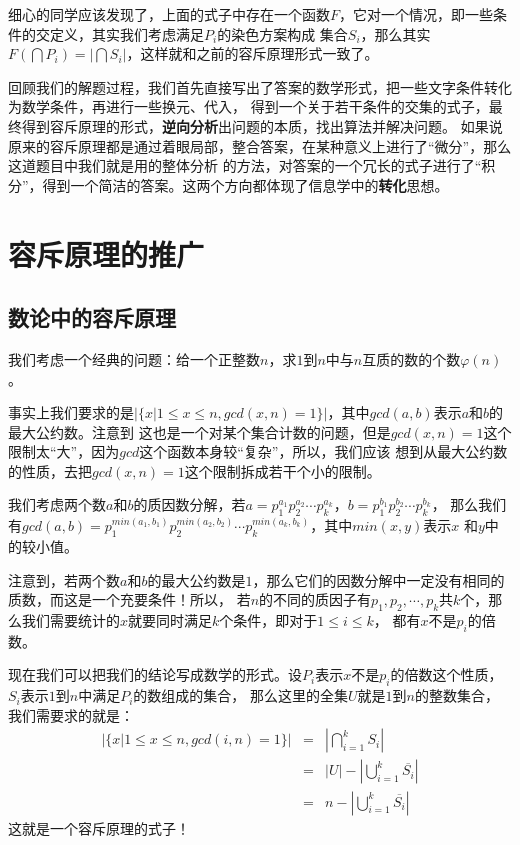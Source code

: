 \documentclass{noithesis}
\theoremstyle{plain}      \newtheorem{theorem}{定理}[subsection]
\theoremstyle{definition} \newtheorem{problem}{问题}[subsection]
\begin{document}
细心的同学应该发现了，上面的式子中存在一个函数$F$，它对一个情况，即一些条件的交定义，其实我们考虑满足$P_i$的染色方案构成
集合$S_i$，那么其实$F\left( \bigcap P_i \right) = | \bigcap S_i |$，这样就和之前的容斥原理形式一致了。 \par

回顾我们的解题过程，我们首先直接写出了答案的数学形式，把一些文字条件转化为数学条件，再进行一些换元、代入，
得到一个关于若干条件的交集的式子，最终得到容斥原理的形式，\textbf{逆向分析}出问题的本质，找出算法并解决问题。
如果说原来的容斥原理都是通过着眼局部，整合答案，在某种意义上进行了“微分”，那么这道题目中我们就是用的整体分析
的方法，对答案的一个冗长的式子进行了“积分”，得到一个简洁的答案。这两个方向都体现了信息学中的\textbf{转化}思想。

\section{容斥原理的推广}

\subsection{数论中的容斥原理}

我们考虑一个经典的问题：给一个正整数$n$，求$1$到$n$中与$n$互质的数的个数$\varphi(n)$。 \par

事实上我们要求的是$|\{ x | 1 \le x \le n, gcd(x, n) = 1 \}|$，其中$gcd(a,b)$表示$a$和$b$的最大公约数。注意到
这也是一个对某个集合计数的问题，但是$gcd(x,n)=1$这个限制太“大”，因为$gcd$这个函数本身较“复杂”，所以，我们应该
想到从最大公约数的性质，去把$gcd(x,n)=1$这个限制拆成若干个小的限制。 \par

我们考虑两个数$a$和$b$的质因数分解，若$a=p_1^{a_1}p_2^{a_2} \cdots p_k^{a_k}$，$b=p_1^{b_1}p_2^{b_2} \cdots p_k^{b_k}$，
那么我们有$gcd(a, b) = p_1^{min(a_1,b_1)}p_2^{min(a_2,b_2)} \cdots p_k^{min(a_k,b_k)}$，其中$min(x,y)$表示$x$
和$y$中的较小值。 \par

注意到，若两个数$a$和$b$的最大公约数是$1$，那么它们的因数分解中一定没有相同的质数，而这是一个充要条件！所以，
若$n$的不同的质因子有$p_1,p_2,\cdots,p_k$共$k$个，那么我们需要统计的$x$就要同时满足$k$个条件，即对于$1 \le i \le k$，
都有$x$不是$p_i$的倍数。 \par

现在我们可以把我们的结论写成数学的形式。设$P_i$表示$x$不是$p_i$的倍数这个性质，$S_i$表示$1$到$n$中满足$P_i$的数组成的集合，
那么这里的全集$U$就是$1$到$n$的整数集合，我们需要求的就是：
\begin{eqnarray*}
|\{x | 1 \le x \le n, gcd(i, n)=1\}| & = & \left| \bigcap_{i=1}^{k} S_i \right| \\
                                     & = & |U| - \left| \bigcup_{i=1}^{k} \overline{S_i} \right| \\
									 & = & n - \left| \bigcup_{i=1}^{k} \overline{S_i} \right|
\end{eqnarray*}
这就是一个容斥原理的式子！ \par
\end{document}
